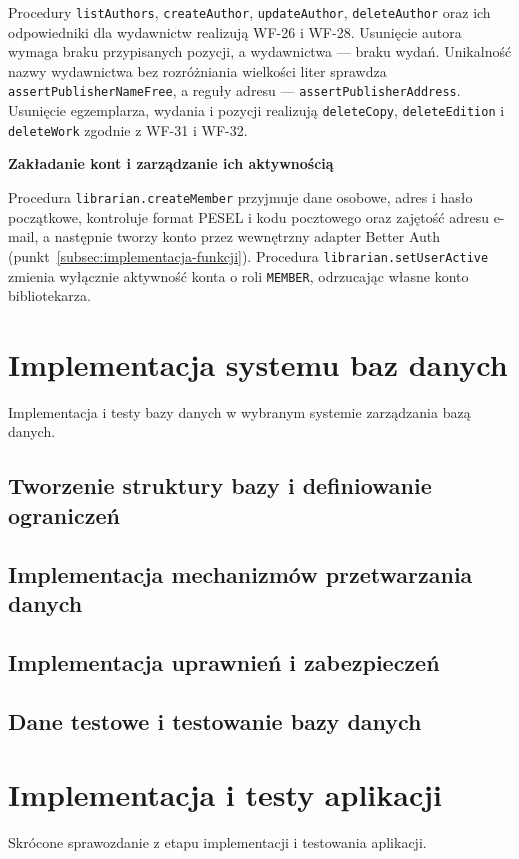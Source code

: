 \documentclass[11pt, a4paper]{article}
\begin{document}
Procedury \texttt{listAuthors}, \texttt{createAuthor}, \texttt{updateAuthor}, \texttt{deleteAuthor} oraz ich odpowiedniki dla wydawnictw realizują WF-26 i WF-28. Usunięcie autora wymaga braku przypisanych pozycji, a wydawnictwa --- braku wydań. Unikalność nazwy wydawnictwa bez rozróżniania wielkości liter sprawdza \texttt{assertPublisherNameFree}, a reguły adresu --- \texttt{assertPublisherAddress}. Usunięcie egzemplarza, wydania i pozycji realizują \texttt{deleteCopy}, \texttt{deleteEdition} i \texttt{deleteWork} zgodnie z WF-31 i WF-32.

\noindent\textbf{Zakładanie kont i zarządzanie ich aktywnością}

Procedura \texttt{librarian.createMember} przyjmuje dane osobowe, adres i hasło początkowe, kontroluje format PESEL i kodu pocztowego oraz zajętość adresu e-mail, a następnie tworzy konto przez wewnętrzny adapter Better Auth (punkt~\ref{subsec:implementacja-funkcji}). Procedura \texttt{librarian.setUserActive} zmienia wyłącznie aktywność konta o roli \texttt{MEMBER}, odrzucając własne konto bibliotekarza.

\section{Implementacja systemu baz danych}
Implementacja i testy bazy danych w wybranym systemie zarządzania bazą danych.

\subsection{Tworzenie struktury bazy i definiowanie ograniczeń}
\subsection{Implementacja mechanizmów przetwarzania danych}
\subsection{Implementacja uprawnień i zabezpieczeń}
\subsection{Dane testowe i testowanie bazy danych}

\section{Implementacja i testy aplikacji}
Skrócone sprawozdanie z etapu implementacji i testowania aplikacji.
\end{document}
